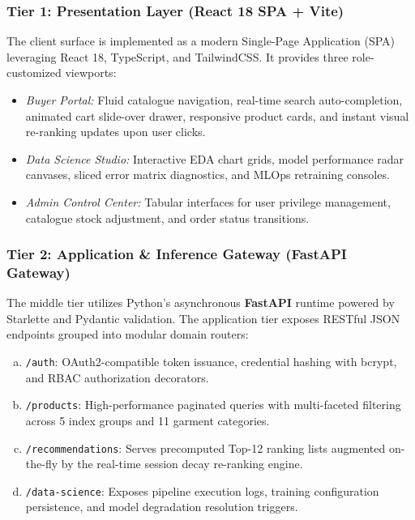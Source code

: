 \subsubsection{Tier 1: Presentation Layer (React 18 SPA + Vite)}
The client surface is implemented as a modern Single-Page Application (SPA) leveraging React 18, TypeScript, and TailwindCSS. It provides three role-customized viewports:
\begin{itemize}
    \item \textit{Buyer Portal:} Fluid catalogue navigation, real-time search auto-completion, animated cart slide-over drawer, responsive product cards, and instant visual re-ranking updates upon user clicks.
    \item \textit{Data Science Studio:} Interactive EDA chart grids, model performance radar canvases, sliced error matrix diagnostics, and MLOps retraining consoles.
    \item \textit{Admin Control Center:} Tabular interfaces for user privilege management, catalogue stock adjustment, and order status transitions.
\end{itemize}

\subsubsection{Tier 2: Application \& Inference Gateway (FastAPI Gateway)}
The middle tier utilizes Python's asynchronous \textbf{FastAPI} runtime powered by Starlette and Pydantic validation. The application tier exposes RESTful JSON endpoints grouped into modular domain routers:
\begin{enumerate}[(a)]
    \item \texttt{/auth}: OAuth2-compatible token issuance, credential hashing with bcrypt, and RBAC authorization decorators.
    \item \texttt{/products}: High-performance paginated queries with multi-faceted filtering across 5 index groups and 11 garment categories.
    \item \texttt{/recommendations}: Serves precomputed Top-12 ranking lists augmented on-the-fly by the real-time session decay re-ranking engine.
    \item \texttt{/data-science}: Exposes pipeline execution logs, training configuration persistence, and model degradation resolution triggers.
\end{enumerate}

